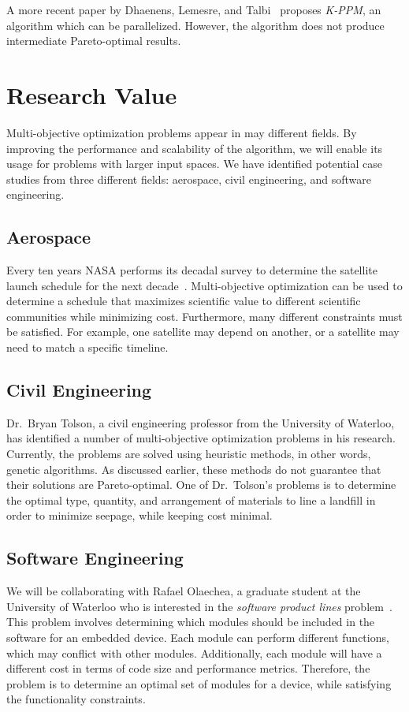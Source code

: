 \documentclass[11pt]{article}
\begin{document}
A more recent paper by Dhaenens, Lemesre, and Talbi~\cite{ref:kppm}
proposes \textit{\mbox{K-PPM}}, an algorithm which can be parallelized.
However, the algorithm does not produce intermediate Pareto-optimal
results.

\section{Research Value}\label{sec:research_val}
Multi-objective optimization problems appear in may different fields.
By improving the performance and scalability of the algorithm, we will
enable its usage for problems with larger input spaces. We have
identified potential case studies from three different fields:
aerospace, civil engineering, and software engineering.

\subsection{Aerospace}\label{sec:aerospace}
Every ten years NASA performs its decadal survey to determine the
satellite launch schedule for the next decade~\cite{ref:nasa11}.
Multi-objective optimization can be used to determine a schedule that
maximizes scientific value to different scientific communities while
minimizing cost. Furthermore, many different constraints must be
satisfied. For example, one satellite may depend on another, or a
satellite may need to match a specific timeline.

\subsection{Civil Engineering}\label{sec:civil_eng}
Dr.\ Bryan Tolson, a civil engineering professor from the University of
Waterloo, has identified a number of multi-objective optimization
problems in his research. Currently, the problems are solved using
heuristic methods, in other words, genetic algorithms. As discussed
earlier, these methods do not guarantee that their solutions are
Pareto-optimal. One of Dr.\ Tolson's problems is to determine the
optimal type, quantity, and arrangement of materials to line a landfill
in order to minimize seepage, while keeping cost minimal.

\subsection{Software Engineering}\label{sec:soft_eng}
We will be collaborating with Rafael Olaechea, a graduate student at
the University of Waterloo who is interested in the \textit{software
product lines} problem~\cite{ref:Olaechea12}. This problem involves
determining which modules should be included in the software for an
embedded device. Each module can perform different functions, which may
conflict with other modules. Additionally, each module will have a
different cost in terms of code size and performance metrics.
Therefore, the problem is to determine an optimal set of modules for a
device, while satisfying the functionality constraints.
\end{document}
